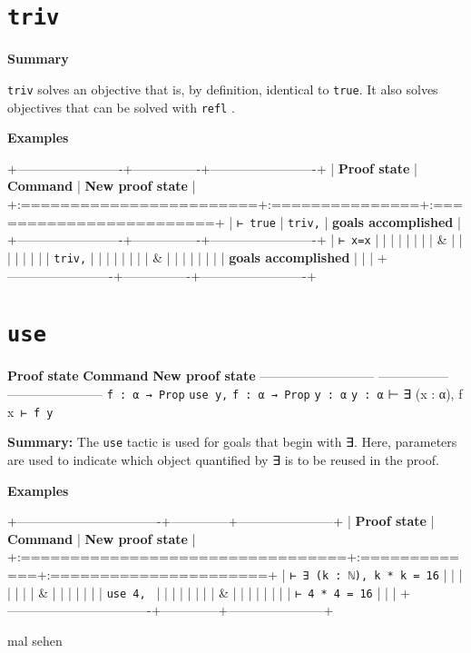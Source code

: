 \documentclass{memoir}
\begin{document}
\section{\Verb|triv|}

\textbf{Summary}

\Verb|triv| solves an objective that is, by definition, identical to \Verb|true|. It also solves objectives that can be solved with \Verb|refl|
.

\textbf{Examples}

+-------------------------+----------------+-------------------------+
| \textbf{Proof state} | \textbf{Command} | \textbf{New proof state} |
+:========================+:===============+:========================+
| \Verb|⊢ true| | \Verb|triv,| | \textbf{goals accomplished} |
+-------------------------+----------------+-------------------------+
| \Verb|⊢ x=x| | | |
| | | |
| & | | |
| | | |
| \Verb|triv,| | | |
| | | |
| & | | |
| | | |
| \textbf{goals accomplished} | | |
+-------------------------+----------------+-------------------------+




\section{\Verb|use|}

\textbf{Proof state} \textbf{Command} \textbf{New proof state}
--------------------------- ----------------- -----------------------
\Verb|f : α → Prop| \Verb|use y,| \Verb|f : α → Prop|
\Verb|y : α| \Verb|y : α|
⊢ ∃ (x : α), f x\Verb| ⊢ f y|

\textbf{Summary:} The \Verb|use| tactic is used for goals that begin with ∃. Here, parameters are used to indicate which object quantified by ∃ is to be reused in the proof.

\textbf{Examples}

+----------------------------------+--------------+-----------------------+
| \textbf{Proof state} | \textbf{Command} | \textbf{New proof state} |
+:=================================+:=============+:======================+
| \Verb|⊢ ∃ (k : ℕ), k * k = 16| | | |
| | |
| & | | |
| | |
| \Verb|use 4, | | | |
| | | |
| & | | |
| | | |
| \Verb|⊢ 4 * 4 = 16| | | |
+----------------------------------+--------------+-----------------------+

mal sehen
\end{document}
